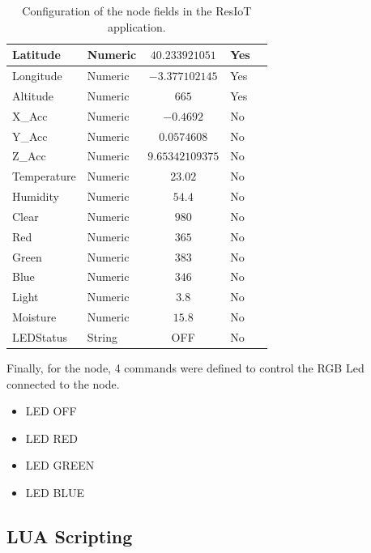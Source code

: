 \begin{itemize}
\begin{table}[H]
\begin{center}
\begin{tabular}{|p{} | p{} |c| p{}| p{}|}
                \hline
                Latitude & Numeric & $40.233921051$ & Yes \\
                \hline
                Longitude & Numeric & $-3.377102145$ & Yes \\
                \hline
                Altitude & Numeric & $665$ & Yes \\
                \hline
                X\_Acc & Numeric & $-0.4692$ & No \\
                \hline
                Y\_Acc & Numeric & $0.0574608$ & No \\
                \hline
                Z\_Acc & Numeric & $9.65342109375$ & No \\
                \hline
                Temperature & Numeric & $23.02$ & No \\
                \hline
                Humidity & Numeric & $54.4$ & No \\
                \hline
                Clear & Numeric & $980$ & No \\
                \hline
                Red & Numeric & $365$ & No \\
                \hline
                Green & Numeric & $383$ & No \\
                \hline
                Blue & Numeric & $346$ & No \\
                \hline
                Light & Numeric & $3.8$ & No \\
                \hline
                Moisture & Numeric & $15.8$ & No \\
                \hline
                LEDStatus & String & OFF & No \\
                \hline
            \end{tabular}
        \end{center}
        \caption{Configuration of the node fields in the ResIoT application.}
        \label{Connections3}
    \end{table}
\end{itemize}

Finally, for the node, 4 commands were defined to control the RGB Led connected to the node.
\begin{itemize}
    \item LED OFF
    \item LED RED
    \item LED GREEN
    \item LED BLUE
\end{itemize}
\subsection{LUA Scripting}
